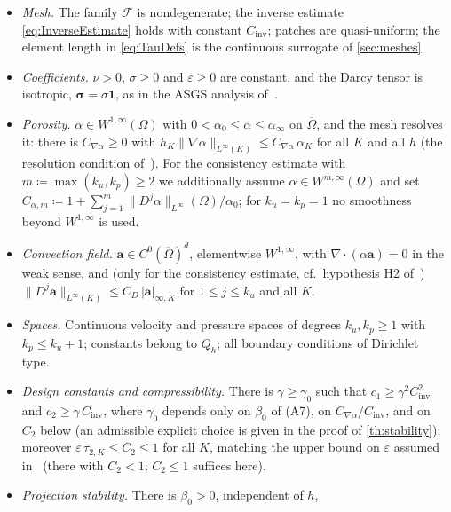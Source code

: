 \documentclass[11pt]{article}
\theoremstyle{remark}
\newcommand{\ba}{\boldsymbol{a}}
\newcommand{\norm}[1]{\lVert #1 \rVert}
\begin{document}
\begin{itemize}[leftmargin=3.2em, itemsep=0.35ex]
  \item[(A1)] \emph{Mesh.} The family $\mathcal{F}$ is nondegenerate; the inverse
  estimate \cref{eq:InverseEstimate} holds with constant $C_{\mathrm{inv}}$; patches
  are quasi-uniform; the element length in \cref{eq:TauDefs} is the continuous
  surrogate of \cref{sec:meshes}.
  \item[(A2)] \emph{Coefficients.} $\nu > 0$, $\sigma \ge 0$ and $\varepsilon \ge 0$
  are constant, and the Darcy tensor is isotropic,
  $\boldsymbol{\sigma} = \sigma\boldsymbol{1}$, as in the ASGS analysis
  of~\cite{companion}.
  \item[(A3)] \emph{Porosity.} $\alpha \in W^{1,\infty}(\Omega)$ with
  $0 < \alpha_0 \le \alpha \le \alpha_\infty$ on $\overline\Omega$, and the mesh
  resolves it: there is $C_{\nabla\alpha} \ge 0$ with
  $h_K \norm{\nabla\alpha}_{L^\infty(K)} \le C_{\nabla\alpha}\, \alpha_K$ for all $K$ and all
  $h$ (the resolution condition of~\cite{companion}). For the consistency estimate with
  $m \coloneqq \max(k_u, k_p) \ge 2$ we additionally assume
  $\alpha \in W^{m,\infty}(\Omega)$ and set
  $C_{\alpha,m} \coloneqq 1 + \sum_{j=1}^{m}\norm{D^j\alpha}_{L^\infty}(\Omega)/\alpha_0$;
  for $k_u = k_p = 1$ no smoothness beyond $W^{1,\infty}$ is used.
  \item[(A4)] \emph{Convection field.} $\ba \in C^0(\overline\Omega)^d$, elementwise
  $W^{1,\infty}$, with $\nabla\cdot(\alpha\ba) = 0$ in the weak sense, and (only for
  the consistency estimate, cf.\ hypothesis H2 of~\cite{Codina2008})
  $\norm{D^j\ba}_{L^\infty(K)} \le C_D\, |\ba|_{\infty,K}$ for $1 \le j \le k_u$ and
  all $K$.
  \item[(A5)] \emph{Spaces.} Continuous velocity and pressure spaces of degrees
  $k_u, k_p \ge 1$ with $k_p \le k_u + 1$; constants belong to $Q_h$; all boundary
  conditions of Dirichlet type.
  \item[(A6)] \emph{Design constants and compressibility.} There is $\gamma \ge \gamma_0$
  such that $c_1 \ge \gamma^2 C_{\mathrm{inv}}^2$ and
  $c_2 \ge \gamma\, C_{\mathrm{inv}}$, where $\gamma_0$ depends only on $\beta_0$ of
  (A7), on $C_{\nabla\alpha}/C_{\mathrm{inv}}$, and on $C_2$ below (an admissible explicit
  choice is given in the proof of \cref{th:stability}); moreover
  $\varepsilon\,\tau_{2,K} \le C_2 \le 1$ for all $K$, matching the upper bound on
  $\varepsilon$ assumed in~\cite{companion} (there with $C_2 < 1$; $C_2 \le 1$ suffices
  here).
  \item[(A7)] \emph{Projection stability.} There is $\beta_0 > 0$, independent of $h$,

\end{itemize}
\end{document}
